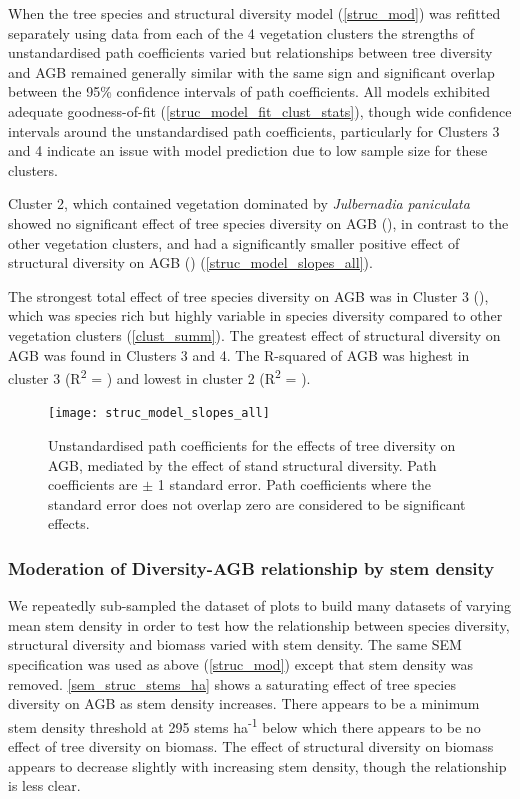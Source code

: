 \documentclass[11pt,a4paper]{article}
\begin{document}
When the tree species and structural diversity model (\autoref{struc_mod}) was refitted separately using data from each of the 4 vegetation clusters the strengths of unstandardised path coefficients varied but relationships between tree diversity and AGB remained generally similar with the same sign and significant overlap between the 95\% confidence intervals of path coefficients. All models exhibited adequate goodness-of-fit (\autoref{struc_model_fit_clust_stats}), though wide confidence intervals around the unstandardised path coefficients, particularly for Clusters 3 and 4 indicate an issue with model prediction due to low sample size for these clusters.

Cluster 2, which contained vegetation dominated by \textit{Julbernadia paniculata} showed no significant effect of tree species diversity on AGB (\strucbsb{}), in contrast to the other vegetation clusters, and had a significantly smaller positive effect of structural diversity on AGB (\strucbhb{}) (\autoref{struc_model_slopes_all}).

The strongest total effect of tree species diversity on AGB was in Cluster 3 (\struccsb{}), which was species rich but highly variable in species diversity compared to other vegetation clusters (\autoref{clust_summ}). The greatest effect of structural diversity on AGB was found in Clusters 3 and 4. The R-squared of AGB was highest in cluster 3 (R\textsuperscript{2} = \struccrsq{}) and lowest in cluster 2 (R\textsuperscript{2} = \strucbrsq{}).

\begin{figure}[H]
\centering
	\texttt{[image: struc\_model\_slopes\_all]}
	\caption{Unstandardised path coefficients for the effects of tree diversity on AGB, mediated by the effect of stand structural diversity. Path coefficients are $\pm$ 1 standard error. Path coefficients where the standard error does not overlap zero are considered to be significant effects.}
	\label{struc_model_slopes_all}
\end{figure}




\subsubsection{Moderation of Diversity-AGB relationship by stem density}

We repeatedly sub-sampled the dataset of plots to build many datasets of varying mean stem density in order to test how the relationship between species diversity, structural diversity and biomass varied with stem density. The same SEM specification was used as above (\autoref{struc_mod}) except that stem density was removed.  \autoref{sem_struc_stems_ha} shows a saturating effect of tree species diversity on AGB as stem density increases. There appears to be a minimum stem density threshold at \textapprox{}295 stems ha\textsuperscript{-1} below which there appears to be no effect of tree diversity on biomass. The effect of structural diversity on biomass appears to decrease slightly with increasing stem density, though the relationship is less clear.
\end{document}
